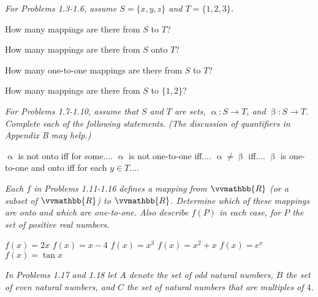 \documentclass{exam}
\begin{document}
\begin{questions}
    \vspace{1.2cm}
    
    \textit{For Problems 1.3-1.6, assume \( S = \{ x, y, z \} \) and \( T = \{ 1, 2, 3 \} \).}

    \question How many mappings are there from \( S \) to \( T \)?

    \vspace{0.5cm}

    \question How many mappings are there from \( S \) onto \( T \)?

    \vspace{0.5cm}

    \question How many one-to-one mappings are there from \( S \) to \( T \)?

    \vspace{0.5cm}

    \question How many mappings are there from \( S \) to \( \{ 1, 2 \} \)?

    \vspace{0.6cm}

    \textit{For Problems 1.7-1.10, assume that \( S \) and \( T \) are sets, \( \upalpha \colon S \to T \), and \( \upbeta \colon S \to T \). Complete each of the following statements. (The discussion of quantifiers in Appendix B may help.)}

    \question \( \upalpha \) is not onto iff for some....
    \question \( \upalpha \) is not one-to-one iff....
    \question \( \upalpha \ne \upbeta \) iff....
    \question \( \upbeta \) is one-to-one and onto iff for each \( y \in T \)....

    \vspace{0.6cm}

    \textit{Each \( f \) in Problems 1.11-1.16 defines a mapping from \( \vvmathbb{R} \) (or a subset of \( \vvmathbb{R} \)) to \( \vvmathbb{R} \). Determine which of these mappings are onto and which are one-to-one. Also describe \( f \left( P \right) \) in each case, for \( P \) the set of positive real numbers.}

    \question \( f \left( x \right) = 2x \)
    \question \( f \left( x \right) = x - 4 \)
    \question \( f \left( x \right) = x^3 \)
    \question \( f \left( x \right) = x^2 + x \)
    \question \( f \left( x \right) = e^x \)
    \question \( f \left( x \right) = \tan{x} \)

    \vspace{0.6cm}

    \newpage

    \textit{In Problems 1.17 and 1.18 let \( A \) denote the set of odd natural numbers, \( B \) the set of even natural numbers, and \( C \) the set of natural numbers that are multiples of \( 4 \).}


\end{questions}
\end{document}

